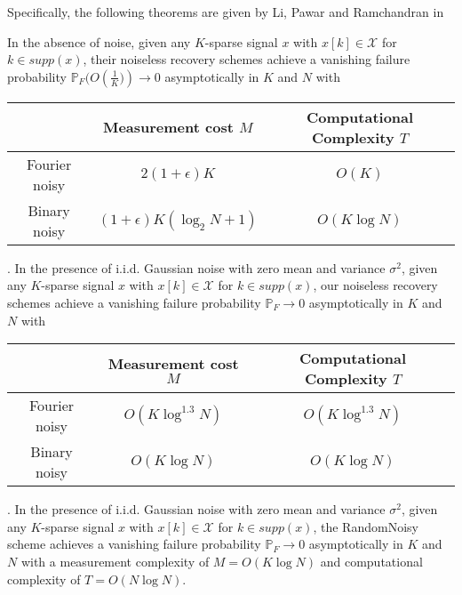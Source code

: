 \documentclass[journal,draft,onecolumn]{IEEEtran}
\begin{document}
Specifically, the following theorems are given by Li, Pawar and Ramchandran in \cite{li2015subdraft}
\begin{theorem}\label{thm:li1}
In the absence of noise, given any $K$-sparse signal $x$ with $x[k] \in \mathcal{X}$ for $k \in supp (x)$, their noiseless recovery schemes achieve a vanishing failure probability $\mathbb{P}_F(O\left(\frac{1}{K})\right) \rightarrow 0$ asymptotically in $K$ and $N$ with
\begin{center}
\begin{tabular}{|c|c|c|}
  \hline
   & Measurement cost $M$ &  Computational Complexity $T$ \\
  \hline
  Fourier noisy & $2(1+\epsilon)K$ & $O(K)$ \\
  \hline
  Binary noisy & $(1+\epsilon)K(\log_2 N+1)$ & $O(K \log N)$ \\
  \hline
\end{tabular}
\end{center}
\end{theorem}
\vspace{2ex}


\begin{theorem}\label{thm:li2}. In the presence of i.i.d. Gaussian noise with zero mean and
variance $\sigma^2$, given any $K$-sparse signal $x$ with $x[k] \in \mathcal{X}$ for $k \in supp (x)$, our noiseless recovery schemes achieve a vanishing failure probability $\mathbb{P}_F \rightarrow 0$ asymptotically in $K$ and $N$ with
\begin{center}
\begin{tabular}{|c|c|c|}
  \hline
   & Measurement cost $M$ &  Computational Complexity $T$ \\
  \hline
  Fourier noisy & $O(K \log^{1.3}N)$ & $O(K \log^{1.3}N)$ \\
  \hline
  Binary noisy & $O(K \log N)$ & $O(K \log N)$ \\
  \hline
\end{tabular}
\end{center}
\end{theorem}
\vspace{2ex}

\begin{theorem}\label{thm:li3}. In the presence of i.i.d. Gaussian noise with zero mean and
variance $\sigma^2$, given any $K$-sparse signal $x$ with $x[k] \in \mathcal{X}$ for $k \in supp (x)$, the RandomNoisy scheme achieves a vanishing failure probability $\mathbb{P}_F \rightarrow 0$ asymptotically in $K$ and $N$ with a measurement complexity of $M = O(K \log N)$ and computational complexity of $T = O(N \log N)$.
\end{theorem}
\end{document}
